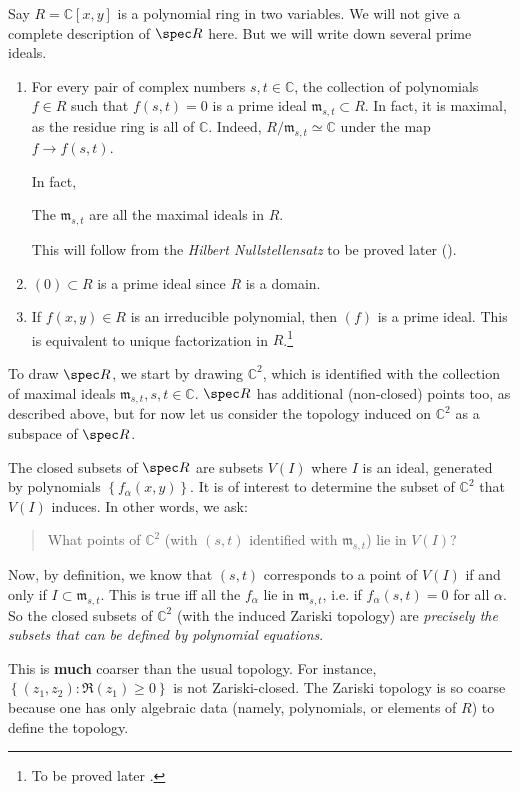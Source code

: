 \begin{example} \label{twovarpoly}
Say $R = \mathbb{C}[x,y]$ is a polynomial ring in two variables.
We will not give a complete description of $\spec R$ here. But we will write
down several
prime ideals.

\begin{enumerate}
\item For every pair of complex numbers $s,t \in \mathbb{C}$,
the collection of polynomials
$f \in R$ such that $f(s,t) = 0$ is a prime ideal $\mathfrak{m}
_{s,t} \subset R$. In
fact, it is maximal, as the residue ring is all of
$\mathbb{C}$. Indeed,
$R/\mathfrak{m}_{s,t} \simeq \mathbb{C}$ under the map $f \to
f(s,t)$.

In fact, 
\begin{theorem}
The $\mathfrak{m}_{s,t}$ are all the maximal ideals in $R$.
\end{theorem} 
This will follow from the \emph{Hilbert Nullstellensatz} to be
proved later
().
\item $(0) \subset R$ is a prime ideal since $R$ is a domain. 
\item If $f(x,y) \in R$ is an irreducible polynomial, then $(f)$
is a prime
ideal. This is equivalent to unique factorization in
$R$.\footnote{To be
proved later \rref{}.}  
\end{enumerate}

To draw $\spec R$, we start by drawing $\mathbb{C}^2$, which is identified
with the
collection of
maximal ideals $\mathfrak{m}_{s,t}, s, t \in \mathbb{C}$. $\spec R$ has
additional (non-closed) points
too, as
described above, but for now let us
consider the topology induced on $\mathbb{C}^2$ as a subspace of
$\spec R$.

The closed subsets of $\spec R$ are subsets $V(I)$ where $I$ is
an ideal,
generated by polynomials $\left\{f_{\alpha}(x,y)\right\}$. It is of interest to
determine the subset of $\mathbb{C}^2$ that
$V(I)$
induces. In other words, we ask:
\begin{quote}
What points of $\mathbb{C}^2$ (with $(s,t)$ identified with
$\mathfrak{m}_{s,t}$) lie in $V(I)$?
\end{quote}
Now, by definition, we know that $(s,t)$ corresponds to a point of $V(I)$ if
and only if $I
\subset \mathfrak{m}_{s,t}$.
This is true iff all the
$f_{\alpha} $ lie in $ \mathfrak{m}_{s,t}$, i.e. if
$f_{\alpha}(s,t) =0$ for all
$\alpha$. So the closed subsets of $\mathbb{C}^2$ (with the
induced Zariski
topology) are \emph{precisely the subsets
that can be defined by polynomial equations}.

This is
\textbf{much} coarser
than the usual topology. For instance, $\left\{(z_1,z_2):
\Re(z_1) \geq 0\right\}$ is
not Zariski-closed. 
The Zariski topology is so coarse because one has only algebraic
data (namely,
polynomials, or elements of $R$) to define the topology.
\end{example} 

